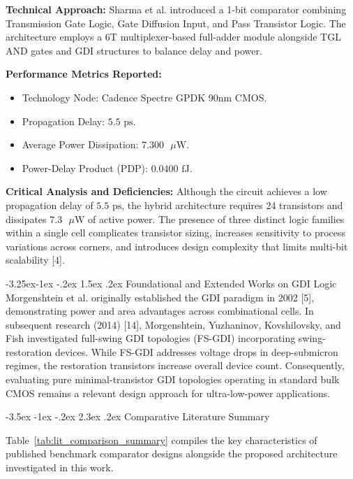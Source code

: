 \documentclass[12pt,a4paper,oneside]{report}
\makeatletter
\renewcommand\section{\@startsection {section}{1}{\z@}%
                                   {-3.5ex \@plus -1ex \@minus -.2ex}%
                                   {2.3ex \@plus.2ex}%
                                   {\normalfont\normalsize\bfseries}}
\renewcommand\subsection{\@startsection{subsection}{2}{\z@}%
                                     {-3.25ex\@plus -1ex \@minus -.2ex}%
                                     {1.5ex \@plus .2ex}%
                                     {\normalfont\normalsize\bfseries\itshape}}
\makeatother
\begin{document}
\noindent\textbf{Technical Approach:} Sharma et al. introduced a 1-bit comparator combining Transmission Gate Logic, Gate Diffusion Input, and Pass Transistor Logic. The architecture employs a 6T multiplexer-based full-adder module alongside TGL AND gates and GDI structures to balance delay and power.

\noindent\textbf{Performance Metrics Reported:}
\begin{itemize}
\item Technology Node: Cadence Spectre GPDK 90nm CMOS.
\item Propagation Delay: $5.5\text{ ps}$.
\item Average Power Dissipation: $7.300\text{ }\mu\text{W}$.
\item Power-Delay Product (PDP): $0.0400\text{ fJ}$.
\end{itemize}

\noindent\textbf{Critical Analysis and Deficiencies:} Although the circuit achieves a low propagation delay of $5.5\text{ ps}$, the hybrid architecture requires 24 transistors and dissipates $7.3\text{ }\mu\text{W}$ of active power. The presence of three distinct logic families within a single cell complicates transistor sizing, increases sensitivity to process variations across corners, and introduces design complexity that limits multi-bit scalability [4].

\subsection{Foundational and Extended Works on GDI Logic}
Morgenshtein et al. originally established the GDI paradigm in 2002 [5], demonstrating power and area advantages across combinational cells. In subsequent research (2014) [14], Morgenshtein, Yuzhaninov, Kovshilovsky, and Fish investigated full-swing GDI topologies (FS-GDI) incorporating swing-restoration devices. While FS-GDI addresses voltage drops in deep-submicron regimes, the restoration transistors increase overall device count. Consequently, evaluating pure minimal-transistor GDI topologies operating in standard bulk CMOS remains a relevant design approach for ultra-low-power applications.

\section{Comparative Literature Summary}

Table~\ref{tab:lit_comparison_summary} compiles the key characteristics of published benchmark comparator designs alongside the proposed architecture investigated in this work.
\end{document}
